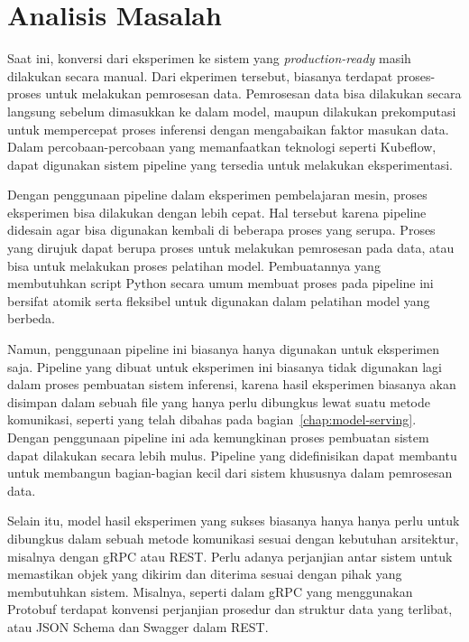 \section{Analisis Masalah}

Saat ini, konversi dari eksperimen ke sistem yang \textit{production-ready} masih dilakukan secara manual.
Dari ekperimen tersebut, biasanya terdapat proses-proses untuk melakukan pemrosesan data.
Pemrosesan data bisa dilakukan secara langsung sebelum dimasukkan ke dalam model, maupun dilakukan prekomputasi untuk mempercepat proses inferensi dengan mengabaikan faktor masukan data.
Dalam percobaan-percobaan yang memanfaatkan teknologi seperti Kubeflow, dapat digunakan sistem pipeline yang tersedia untuk melakukan eksperimentasi.

Dengan penggunaan pipeline dalam eksperimen pembelajaran mesin, proses eksperimen bisa dilakukan dengan lebih cepat.
Hal tersebut karena pipeline didesain agar bisa digunakan kembali di beberapa proses yang serupa.
Proses yang dirujuk dapat berupa proses untuk melakukan pemrosesan pada data, atau bisa untuk melakukan proses pelatihan model.
Pembuatannya yang membutuhkan script Python secara umum membuat proses pada pipeline ini bersifat atomik serta fleksibel untuk digunakan dalam pelatihan model yang berbeda.

Namun, penggunaan pipeline ini biasanya hanya digunakan untuk eksperimen saja.
Pipeline yang dibuat untuk eksperimen ini biasanya tidak digunakan lagi dalam proses pembuatan sistem inferensi, karena hasil eksperimen biasanya akan disimpan dalam sebuah file yang hanya perlu dibungkus lewat suatu metode komunikasi, seperti yang telah dibahas pada bagian~\ref{chap:model-serving}.
Dengan penggunaan pipeline ini ada kemungkinan proses pembuatan sistem dapat dilakukan secara lebih mulus.
Pipeline yang didefinisikan dapat membantu untuk membangun bagian-bagian kecil dari sistem khususnya dalam pemrosesan data. 

Selain itu, model hasil eksperimen yang sukses biasanya hanya hanya perlu untuk dibungkus dalam sebuah metode komunikasi sesuai dengan kebutuhan arsitektur, misalnya dengan gRPC atau REST.\@
Perlu adanya perjanjian antar sistem untuk memastikan objek yang dikirim dan diterima sesuai dengan pihak yang membutuhkan sistem.
Misalnya, seperti dalam gRPC yang menggunakan Protobuf terdapat konvensi perjanjian prosedur dan struktur data yang terlibat, atau JSON Schema dan Swagger dalam REST.\@
